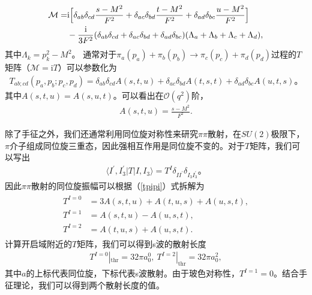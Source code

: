 \documentclass[aps,tightenlines,16pt]{ctexart}
\numberwithin{equation}{section}
\begin{document}
\begin{align}\label{mpipi}
   \begin{aligned}
   \mathcal{M} =& \mbox{i}\Bigl[\delta_{ab}\delta_{cd}\frac{s-M^2}{F^2}+\delta_{ac}\delta_{bd}\frac{t-M^2}{F^2}+\delta_{ad}\delta_{bc}\frac{u-M^2}{F^2}\Bigr]
   \\
   & - \frac{\mbox{i}}{3F^2}(\delta_{ab}\delta_{cd}+\delta_{ac}\delta_{bd}+\delta_{ad}\delta_{bc})(\Lambda_a+\Lambda_b+\Lambda_c+\Lambda_d),
\end{aligned}
\end{align}
其中$\Lambda_k=p_k^2-M^2$。
通常对于$\pi_a(p_a)+\pi_b(p_b)\to \pi_c(p_c)+\pi_d(p_d)$过程的$T$矩阵（$\mathcal{M}=\mbox{i}T$）可以参数化为
\begin{align}\label{tpipi}
   T_{ab;cd}(p_a,p_b;p_c,p_d)=\delta_{ab}\delta_{cd}A(s,t,u)+\delta_{ac}\delta_{bd}A(t,s,t)+\delta_{ad}\delta_{bc}A(u,t,s)。
\end{align}
其中$A(s,t,u)=A(s,u,t)$。可以看出在$\mathcal{O}(q^2)$阶，
\begin{align}
   A(s,t,u)=\frac{s-M^2}{F^2}.
\end{align}



除了手征之外，我们还通常利用同位旋对称性来研究$\pi\pi$散射，在$SU(2)$极限下，$\pi$介子组成同位旋三重态，因此强相互作用是同位旋不变的。对于$T$矩阵，我们可以写出
\begin{align}
   \langle I^{\prime},I^{\prime}_3|T|I,I_3\rangle = T^I \delta_{II^{\prime}}\delta_{I_3I_3^{\prime}}。
\end{align}
因此$\pi\pi$散射的同位旋振幅可以根据（\ref{tpipi}）式拆解为\cite{GASSER1984142}
\begin{align}
   \begin{aligned}
   T^{I=0}&=3A(s,t,u)+A(t,u,s)+A(u,s,t),\\
   T^{I=1}&=A(s,t,u)-A(u,s,t),\\
   T^{I=2}&=A(t,u,s)+A(u,s,t).
   \end{aligned}
\end{align}
计算开启域附近的$T$矩阵，我们可以得到s波的散射长度
\begin{align}\label{a}
   T^{I=0}|_{\text{thr}} = 32\pi a_0^0,\ T^{I=2}|_{\text{thr}}=32\pi a_0^2,
\end{align}
其中$a$的上标代表同位旋，下标代表s波散射。由于玻色对称性，$T^{I=1}=0$。结合手征理论，我们可以得到两个散射长度的值。
\end{document}
